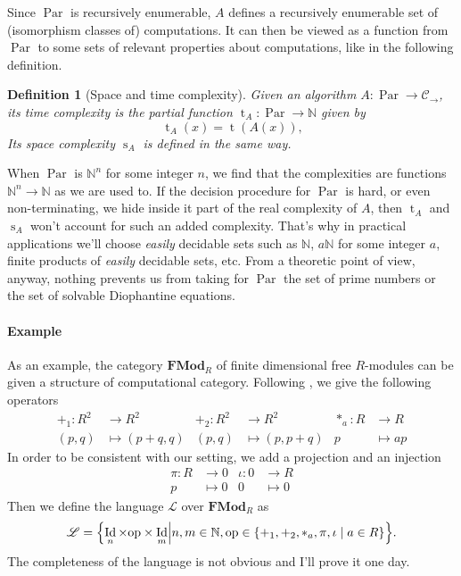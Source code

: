 \documentclass{article}
\newcommand{\cat}[1]{\mathscr{#1}}
\newcommand{\lcat}[1]{\mathbf{#1}}
\newcommand{\C}{\cat{C}}
\renewcommand{\L}{\cat{L}}
\DeclareMathOperator{\Id}{Id}
\newcommand{\N}{\mathbb{N}}
\newcommand{\ra}{\rightarrow}
\DeclareMathOperator{\Time}{t}
\DeclareMathOperator{\Space}{s}
\DeclareMathOperator{\Par}{Par}
\newtheorem{definition}{Definition}
\begin{document}
  Since $\Par$ is recursively enumerable, $A$ defines a recursively
  enumerable set of (isomorphism classes of) computations. It can then
  be viewed as a function from $\Par$ to some sets of relevant
  properties about computations, like in the following definition.

  \begin{definition}[Space and time complexity]
    Given an algorithm $A:\Par\ra\C_\ra$, its \emph{time complexity}
    is the partial function ${\Time_A:\Par\ra\N}$ given by
    \begin{equation*}
      \Time_A(x) = \Time(A(x)) \text{,}
    \end{equation*}
    Its \emph{space complexity} $\Space_A$ is defined in the same way.
  \end{definition}

  When $\Par$ is $\N^n$ for some integer $n$, we find that the
  complexities are functions $\N^n\ra\N$ as we are used to. If the
  decision procedure for $\Par$ is hard, or even non-terminating, we
  hide inside it part of the real complexity of $A$, then $\Time_A$
  and $\Space_A$ won't account for such an added complexity. That's
  why in practical applications we'll choose \emph{easily} decidable
  sets such as $\N$, $a\N$ for some integer $a$, finite products of
  \emph{easily} decidable sets, etc. From a theoretic point of view,
  anyway, nothing prevents us from taking for $\Par$ the set of prime
  numbers or the set of solvable Diophantine equations.

  \paragraph{Example}
  As an example, the category $\lcat{FMod}_R$ of finite dimensional
  free $R$-modules can be given a structure of computational
  category. Following \cite{BLS03}, we give the following operators
  \begin{align*}
    +_1 : R^2 &\ra R^2         &   +_2 : R^2&\ra R^2       &  *_a : R&\ra R\\
         (p,q)&\mapsto(p+q,q)  &      (p,q)&\mapsto(p,p+q) &       p&\mapsto ap
  \end{align*}
  In order to be consistent with our setting, we add a projection and
  an injection
  \begin{align*}
    \pi : R&\ra 0     &  \iota : 0&\ra R   \\
          p&\mapsto0  &          0&\mapsto0
  \end{align*}
  Then we define the language $\L$ over $\lcat{FMod}_R$ as 
  \begin{equation}
    \label{eq:linlang}
    \L = \Bigl\{\Id_n\times\mathrm{op}\times\Id_m \Bigl\lvert
    n,m\in\N, \mathrm{op}\in\{+_1,+_2,*_a,\pi,\iota\;|\;a\in R\} \Bigr\}
    \text{.}
  \end{equation}
  The completeness of the language is not obvious and I'll prove it
  one day.
\end{document}

